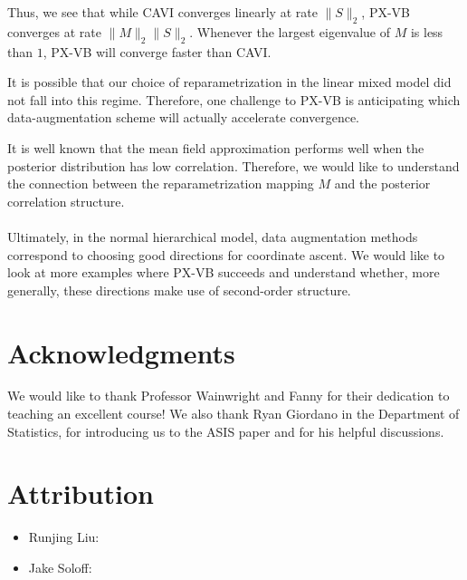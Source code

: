 \documentclass{article}
\begin{document}
Thus, we see that while CAVI converges linearly at rate $\|S\|_2$, PX-VB converges at rate $\|M\|_2\|S\|_2$. Whenever the largest eigenvalue of $M$ is less than $1$, PX-VB will converge faster than CAVI. 

It is possible that our choice of reparametrization in the linear mixed model did not fall into this regime. Therefore, one challenge to PX-VB is anticipating which data-augmentation scheme will actually accelerate convergence. 

{\color{red} 

It is well known that the mean field approximation performs well when the posterior distribution has low correlation. Therefore, we would like to understand the connection between the reparametrization mapping $M$ and the posterior correlation structure. ~\\~\\

Ultimately, in the normal hierarchical model, data augmentation methods correspond to choosing good directions for coordinate ascent. We would like to look at more examples where PX-VB succeeds and understand whether, more generally, these directions make use of second-order structure.
}

\newpage

\section*{Acknowledgments}
We would like to thank Professor Wainwright and Fanny for their dedication to teaching an excellent course! We also thank Ryan Giordano in the Department of Statistics, for introducing us to the ASIS paper \cite{Yu} and for his helpful discussions.


\section*{Attribution}
\begin{itemize}
\item Runjing Liu: 
\item Jake Soloff: 
\end{itemize}
\end{document}
